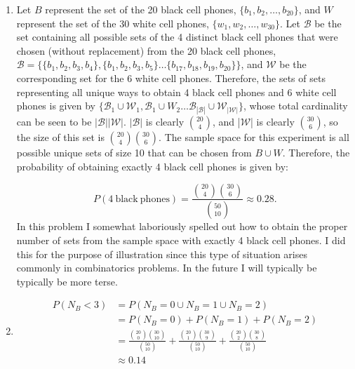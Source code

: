 \begin{problem}{3} $ $

	\begin{enumerate}

		\item 
			Let $B$ represent the set of the 20 black cell phones, $\{b_1, b_2, \ldots, b_{20} \}$, and $W$ represent the set of the 30 white cell phones, $ \{w_1, w_2, \ldots, w_{30} \}$.  Let $\mathcal B$ be the set containing all possible sets of the 4 distinct black cell phones that were chosen (without replacement) from the 20 black cell phones, $\mathcal B = \{ \{b_1, b_2, b_3, b_4\}, \{b_1, b_2, b_3, b_5\} \ldots \{b_{17}, b_{18}, b_{19}, b_{20}\}  \}$, and $\mathcal W$ be the corresponding set for the 6 white cell phones.  Therefore, the sets of sets representing all unique ways to obtain 4 black cell phones and 6 white cell phones is given by $\{ \mathcal B_1\cup \mathcal W_1,  \mathcal B_1\cup W_2\ldots \mathcal B_{|\mathcal B|} \cup \mathcal W_{|\mathcal W|} \}$, whose total cardinality can be seen to be $ |\mathcal B|  |\mathcal W|$.  $ |\mathcal B|$ is clearly $\binom{20}{4}$, and |$\mathcal W$| is clearly $\binom{30}{6}$, so the size of this set is $\binom{20}{4}\binom{30}{6}$.  The sample space for this experiment is all possible unique sets of size 10 that can be chosen from $B \cup W$.  Therefore, the probability of obtaining exactly 4 black cell phones is given by:
			
			\begin{equation}
				P(4~\mathrm{black~phones}) = \frac{\binom{20}{4} \binom{30}{6}} {\binom{50}{10}} \approx 0.28.
			\end{equation}
In this problem I somewhat laboriously spelled out how to obtain the proper number of sets from the sample space with exactly 4 black cell phones.  I did this for the purpose of illustration since this type of situation arises commonly in combinatorics problems.  In the future I will typically be typically be more terse.
		
	\item 
		\begin{align*}
			P(N_B<3) &= P(N_B=0 \cup N_B=1 \cup N_B=2) \\
			& =P(N_B=0) + P(N_B=1)+ P(N_B=2) \\
			& = \frac{\binom{20}{0} \binom{30}{10}} {\binom{50}{10}}+\frac{\binom{20}{1} \binom{30}{9}} {\binom{50}{10}}+\frac{\binom{20}{2} \binom{30}{8}} {\binom{50}{10}} \\
			& \approx 0.14
		\end{align*}
			

	\end{enumerate}

\end{problem}

